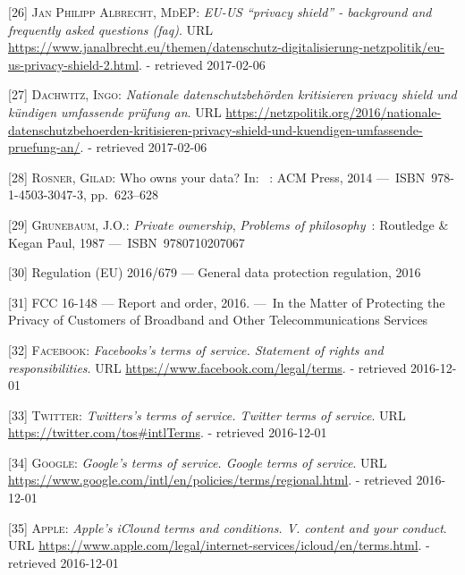 \documentclass[12pt,english,a4paper,titlepage,cleardoublepage=empty,dottedtoc]{report}
\begin{document}
\hypertarget{ref-web_2017_privacy-shield_faq}{}
{[}26{]} \textsc{Jan Philipp Albrecht, MdEP}: \emph{EU-US ``privacy
shield'' - background and frequently asked questions (faq)}. URL
\url{https://www.janalbrecht.eu/themen/datenschutz-digitalisierung-netzpolitik/eu-us-privacy-shield-2.html}.
- retrieved 2017-02-06

\hypertarget{ref-web_2017_privacy-shield_kritik}{}
{[}27{]} \textsc{Dachwitz, Ingo}: \emph{Nationale datenschutzbehörden
kritisieren privacy shield und kündigen umfassende prüfung an}. URL
\url{https://netzpolitik.org/2016/nationale-datenschutzbehoerden-kritisieren-privacy-shield-und-kuendigen-umfassende-pruefung-an/}.
- retrieved 2017-02-06

\hypertarget{ref-paper_2014_who-owns-yours-data}{}
{[}28{]} \textsc{Rosner, Gilad}: Who owns your data? In: ~: ACM Press,
2014 ---~ISBN~978-1-4503-3047-3, pp.~623--628

\hypertarget{ref-book_1987_private-ownership_definition}{}
{[}29{]} \textsc{Grunebaum, J.O.}: \emph{Private ownership},
\emph{Problems of philosophy}~: Routledge \& Kegan Paul, 1987
---~ISBN~9780710207067

\hypertarget{ref-regulation_2016_eu_general-data-protection-regulation_ownership}{}
{[}30{]} Regulation (EU) 2016/679 --- General data protection
regulation, 2016

\hypertarget{ref-rules_2016_fcc_to-protect-broadband-consumer-privacy_ownership}{}
{[}31{]} FCC 16-148 --- Report and order, 2016. ---~In the Matter of
Protecting the Privacy of Customers of Broadband and Other
Telecommunications Services

\hypertarget{ref-web_2016_facebook_terms-of-service}{}
{[}32{]} \textsc{Facebook}: \emph{Facebooks's terms of service.
Statement of rights and responsibilities}. URL
\url{https://www.facebook.com/legal/terms}. - retrieved 2016-12-01

\hypertarget{ref-web_2016_twitter_terms-of-service}{}
{[}33{]} \textsc{Twitter}: \emph{Twitters's terms of service. Twitter
terms of service}. URL \url{https://twitter.com/tos\#intlTerms}. -
retrieved 2016-12-01

\hypertarget{ref-web_2016_google_terms-of-service}{}
{[}34{]} \textsc{Google}: \emph{Google's terms of service. Google terms
of service}. URL
\url{https://www.google.com/intl/en/policies/terms/regional.html}. -
retrieved 2016-12-01

\hypertarget{ref-web_2016_apple-icloud_terms-of-service}{}
{[}35{]} \textsc{Apple}: \emph{Apple's iClound terms and conditions. V.
content and your conduct}. URL
\url{https://www.apple.com/legal/internet-services/icloud/en/terms.html}.
- retrieved 2016-12-01
\end{document}
